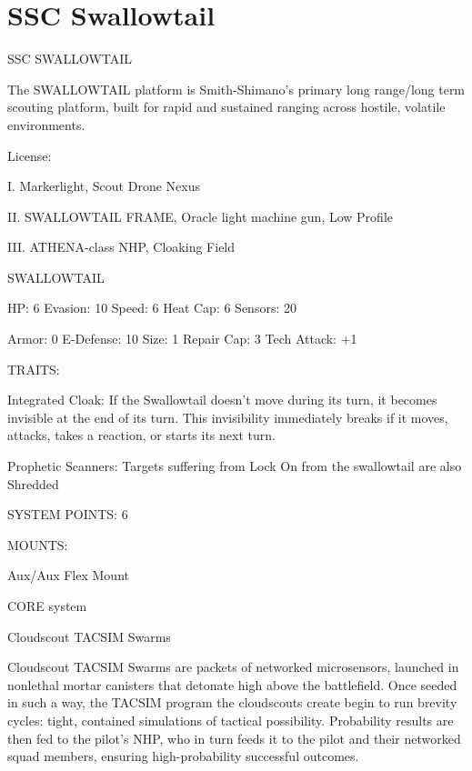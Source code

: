 \section{SSC Swallowtail}


                                          SSC SWALLOWTAIL

The SWALLOWTAIL platform is Smith-Shimano’s primary long range/long term scouting platform,
built for rapid and sustained ranging across hostile, volatile environments.

                                                     License:





I. Markerlight, Scout Drone Nexus

II. SWALLOWTAIL FRAME,  Oracle light machine gun, Low Profile

III. ATHENA-class NHP, Cloaking Field


                                                SWALLOWTAIL

  HP: 6           Evasion: 10                            Speed: 6            Heat Cap: 6         Sensors: 20

  Armor: 0        E-Defense: 10                          Size: 1             Repair Cap: 3       Tech Attack:
                                                                                                 +1

                                                      TRAITS:

  Integrated Cloak: If the Swallowtail doesn’t move during its turn, it becomes invisible at the end of its
  turn. This invisibility immediately breaks if it moves, attacks, takes a reaction, or starts its next turn.

  Prophetic Scanners: Targets suffering from Lock On from the swallowtail are also Shredded

                                               SYSTEM POINTS: 6

                                                     MOUNTS:

  Aux/Aux                                                 Flex Mount

                                                   CORE system

                                          Cloudscout TACSIM Swarms

  Cloudscout TACSIM Swarms are packets of networked microsensors, launched in nonlethal mortar
  canisters that detonate high above the battlefield. Once seeded in such a way, the TACSIM program the
  cloudscouts create begin to run brevity cycles: tight, contained simulations of tactical possibility.
  Probability results are then fed to the pilot’s NHP, who in turn feeds it to the pilot and their networked
  squad members, ensuring high-probability successful outcomes.

